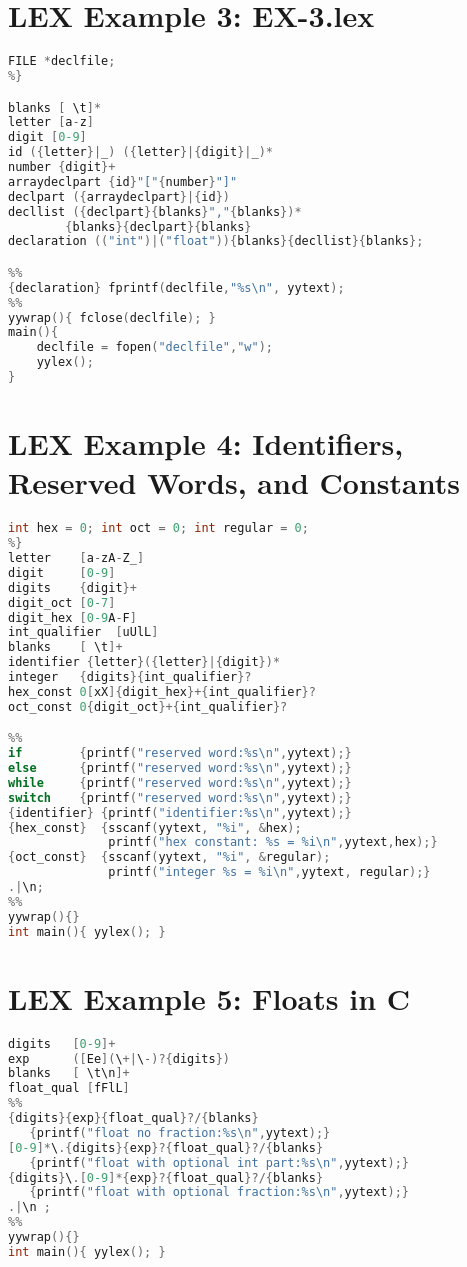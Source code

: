 \documentclass[12pt,a4paper]{article}
\begin{document}
\section*{LEX Example 3: EX-3.lex}
\begin{lstlisting}[language=C]
%{
FILE *declfile;
%}

blanks [ \t]*
letter [a-z]
digit [0-9]
id ({letter}|_) ({letter}|{digit}|_)*
number {digit}+
arraydeclpart {id}"["{number}"]"
declpart ({arraydeclpart}|{id})
decllist ({declpart}{blanks}","{blanks})*
        {blanks}{declpart}{blanks}
declaration (("int")|("float")){blanks}{decllist}{blanks};

%%
{declaration} fprintf(declfile,"%s\n", yytext);
%%
yywrap(){ fclose(declfile); }
main(){
    declfile = fopen("declfile","w");
    yylex();
}
\end{lstlisting}

\section*{LEX Example 4: Identifiers, Reserved Words, and Constants}
\begin{lstlisting}[language=C]
%{
int hex = 0; int oct = 0; int regular = 0;
%}
letter    [a-zA-Z_]
digit     [0-9]
digits    {digit}+
digit_oct [0-7]
digit_hex [0-9A-F]
int_qualifier  [uUlL]
blanks    [ \t]+
identifier {letter}({letter}|{digit})*
integer   {digits}{int_qualifier}?
hex_const 0[xX]{digit_hex}+{int_qualifier}?
oct_const 0{digit_oct}+{int_qualifier}?

%%
if        {printf("reserved word:%s\n",yytext);}
else      {printf("reserved word:%s\n",yytext);}
while     {printf("reserved word:%s\n",yytext);}
switch    {printf("reserved word:%s\n",yytext);}
{identifier} {printf("identifier:%s\n",yytext);}
{hex_const}  {sscanf(yytext, "%i", &hex);
              printf("hex constant: %s = %i\n",yytext,hex);}
{oct_const}  {sscanf(yytext, "%i", &regular);
              printf("integer %s = %i\n",yytext, regular);}
.|\n;
%%
yywrap(){}
int main(){ yylex(); }
\end{lstlisting}

\section*{LEX Example 5: Floats in C}
\begin{lstlisting}[language=C]
digits   [0-9]+
exp      ([Ee](\+|\-)?{digits})
blanks   [ \t\n]+
float_qual [fFlL]
%%
{digits}{exp}{float_qual}?/{blanks}
   {printf("float no fraction:%s\n",yytext);}
[0-9]*\.{digits}{exp}?{float_qual}?/{blanks}
   {printf("float with optional int part:%s\n",yytext);}
{digits}\.[0-9]*{exp}?{float_qual}?/{blanks}
   {printf("float with optional fraction:%s\n",yytext);}
.|\n ;
%%
yywrap(){}
int main(){ yylex(); }
\end{lstlisting}
\end{document}
